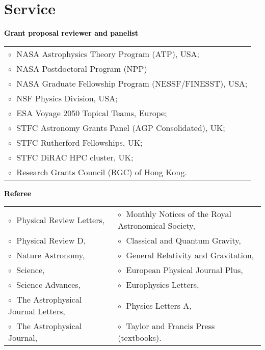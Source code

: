 \documentclass[a4paper]{moderncv}
\begin{document}
\section{Service}

 \textbf{\textcolor{black}{Grant proposal reviewer and panelist}}\vspace{0.1cm}\\
\begin{tabular}{@{\hskip 0.4cm}l}
$\circ\;$ NASA Astrophysics Theory Program (ATP), USA; \\
$\circ\;$ NASA Postdoctoral Program (NPP)\\
$\circ\;$ NASA Graduate Fellowship Program (NESSF/FINESST), USA; \\
$\circ\;$ NSF Physics Division, USA;
\\
$\circ\;$ ESA Voyage 2050 Topical Teams, Europe;
 \\
$\circ\;$ STFC Astronomy Grants Panel (AGP Consolidated), UK;
\\
$\circ\;$ STFC Rutherford Fellowships, UK;
\\
$\circ\;$ STFC DiRAC HPC cluster, UK;
\\
$\circ\;$ Research Grants Council (RGC) of Hong Kong.
\end{tabular}
\vspace{0.2cm}

\newpage

\textbf{\textcolor{black}{Referee}}\vspace{0.1cm}\\
\begin{tabular}{@{\hskip 0.4cm}l@{\hskip 0.4in}l}
$\circ\;$ Physical Review Letters, & $\circ\;$ Monthly Notices of the Royal Astronomical Society,   \\
$\circ\;$ Physical Review D, & $\circ\;$  Classical and Quantum Gravity,  \\
$\circ\;$ Nature Astronomy,  & $\circ\;$ General Relativity and Gravitation,  \\
$\circ\;$ Science,  & $\circ\;$ European Physical Journal Plus, \\
$\circ\;$ Science Advances, & $\circ\;$  Europhysics Letters, \\
$\circ\;$  The Astrophysical Journal Letters,  &  $\circ\;$ Physics Letters A, \\
$\circ\;$ The Astrophysical Journal,  &  $\circ\;$ Taylor and Francis Press (textbooks).
\end{tabular}
\vspace{0.2cm}
 
\end{document}

